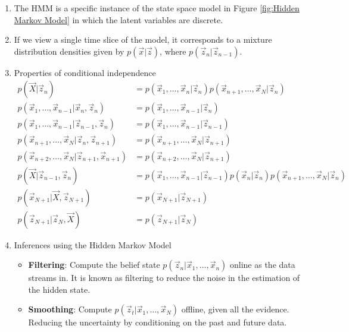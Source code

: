 \documentclass[12pt,twoside]{article}
\begin{document}
\begin{enumerate}
	\item The HMM is a specific instance of the state space model in Figure \ref{fig:Hidden Markov Model} in which the latent variables are discrete.
	\item If we view a single time slice of the model, it corresponds to a mixture distribution densities given by $p(\vec{x}\vert \vec{z})$, where $p(\vec{z}_n \vert \vec{z}_{n-1})$.
	\item Properties of conditional independence
	\begin{align*}
		p(\vec{X}\vert \vec{z}_n)	 &= p(\vec{x}_1,\ldots, \vec{x}_n\vert \vec{z}_n)p(\vec{x}_{n+1},\ldots, \vec{x}_N\vert \vec{z}_n)\\
		p(\vec{x}_1,\ldots, \vec{x}_{n-1} \vert \vec{x}_n, \vec{z}_n)	&= p(\vec{x}_1,\ldots, \vec{x}_{n-1}\vert \vec{z}_n)\\
		p(\vec{x}_1,\ldots, \vec{x}_{n-1} \vert \vec{z}_{n-1}, \vec{z}_n)	&= p(\vec{x}_1,\ldots, \vec{x}_{n-1}\vert \vec{z}_{n-1})\\
		p(\vec{x}_{n+1},\ldots, \vec{x}_N \vert \vec{z}_n, \vec{z}_{n+1})&= p(\vec{x}_{n+1},\ldots, \vec{x}_N \vert \vec{z}_{n+1})\\
		p(\vec{x}_{n+2},\ldots, \vec{x}_N \vert \vec{z}_{n+1}, \vec{x}_{n+1})	& =p(\vec{x}_{n+2},\ldots, \vec{x}_N \vert \vec{z}_{n+1})\\
		p(\vec{X}\vert \vec{z}_{n-1}, \vec{z}_n) & = p(\vec{x}_1,\ldots, \vec{x}_{n-1}\vert \vec{z}_{n-1})p(\vec{x}_n\vert\vec{z}_n)p(\vec{x}_{n+1},\ldots, \vec{x}_N\vert \vec{z}_n)\\
		p(\vec{x}_{N+1}\vert \vec{X}, \vec{z}_{N+1})& = p(\vec{x}_{N+1}\vert \vec{z}_{N+1})\\
		p(\vec{z}_{N+1}\vert \vec{z}_N, \vec{X})	& = p(\vec{z}_{N+1}\vert \vec{z}_N)
	\end{align*}		
	
	\item Inferences using the Hidden Markov Model
		\begin{itemize}
			\item \textbf{Filtering}: Compute the belief state $p(\vec{z}_n \vert \vec{x}_1,\ldots, \vec{x}_n)$ online as the data streams in. It is known as filtering to reduce the noise in the estimation of the hidden state.
			
			\item \textbf{Smoothing}: Compute $p(\vec{z}_t\vert  \vec{x}_1,\ldots, \vec{x}_N)$ offline, given all the evidence. Reducing the uncertainty by conditioning on the past and future data. 
			

\end{itemize}
\end{enumerate}
\end{document}
